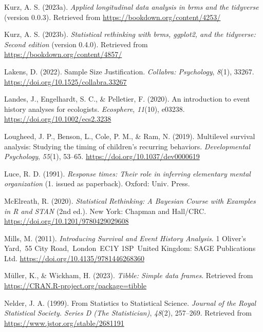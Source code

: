 \documentclass[
  man, donotrepeattitle,floatsintext]{apa6}
\newlength{\cslhangindent}
\newenvironment{CSLReferences}[2] %
 {\begin{list}{}{%
  \setlength{\itemindent}{0pt}
  \setlength{\leftmargin}{0pt}
  \setlength{\parsep}{0pt}
  \ifodd #1
   \setlength{\leftmargin}{\cslhangindent}
   \setlength{\itemindent}{-1\cslhangindent}
  \fi
  \setlength{\itemsep}{#2\baselineskip}}}
 {\end{list}}
\begin{document}
\begin{CSLReferences}{1}{0}
Kurz, A. S. (2023a). \emph{Applied longitudinal data analysis in brms and the tidyverse} (version 0.0.3). Retrieved from \url{https://bookdown.org/content/4253/}

Kurz, A. S. (2023b). \emph{Statistical rethinking with brms, ggplot2, and the tidyverse: {Second} edition} (version 0.4.0). Retrieved from \url{https://bookdown.org/content/4857/}

Lakens, D. (2022). Sample {Size Justification}. \emph{Collabra: Psychology}, \emph{8}(1), 33267. \url{https://doi.org/10.1525/collabra.33267}

Landes, J., Engelhardt, S. C., \& Pelletier, F. (2020). An introduction to event history analyses for ecologists. \emph{Ecosphere}, \emph{11}(10), e03238. \url{https://doi.org/10.1002/ecs2.3238}

Lougheed, J. P., Benson, L., Cole, P. M., \& Ram, N. (2019). Multilevel survival analysis: {Studying} the timing of children's recurring behaviors. \emph{Developmental Psychology}, \emph{55}(1), 53--65. \url{https://doi.org/10.1037/dev0000619}

Luce, R. D. (1991). \emph{Response times: Their role in inferring elementary mental organization} (1. issued as paperback). Oxford: Univ. Press.

McElreath, R. (2020). \emph{Statistical {Rethinking}: {A Bayesian Course} with {Examples} in {R} and {STAN}} (2nd ed.). New York: {Chapman and Hall/CRC}. \url{https://doi.org/10.1201/9780429029608}

Mills, M. (2011). \emph{Introducing {Survival} and {Event History Analysis}}. 1 Oliver's Yard,~55 City Road,~London~EC1Y 1SP~United Kingdom: SAGE Publications Ltd. \url{https://doi.org/10.4135/9781446268360}

Müller, K., \& Wickham, H. (2023). \emph{Tibble: Simple data frames}. Retrieved from \url{https://CRAN.R-project.org/package=tibble}

Nelder, J. A. (1999). From {Statistics} to {Statistical Science}. \emph{Journal of the Royal Statistical Society. Series D (The Statistician)}, \emph{48}(2), 257--269. Retrieved from \url{https://www.jstor.org/stable/2681191}


\end{CSLReferences}
\end{document}
